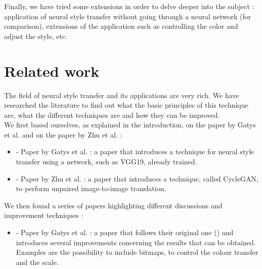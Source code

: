 \documentclass[twocolumn,superscriptaddress,aps]{revtex4-1}
\begin{document}
    Finally, we have tried some extensions in order to delve deeper into the subject : application of neural style transfer without going through a neural network (for comparison), extensions of the application such as controlling the color and adjust the style, etc.
    
    
    
    
    \section{Related work}
    
    The field of neural style transfer and its applications are very rich. We have researched the literature to find out what the basic principles of this technique are, what the different techniques are and how they can be improved.\\
    
    We first based ourselves, as explained in the introduction, on the paper by Gatys et al. and on the paper by Zhu et al. :
    
    \begin{itemize}
        \item \cite{DBLP:journals/corr/GatysEB15a} - Paper by Gatys et al. : a paper that introduces a technique for neural style transfer using a network, such as VGG19, already trained.
        \item \cite{DBLP:journals/corr/ZhuPIE17} - Paper by Zhu et al. : a paper that introduces a technique, called CycleGAN, to perform unpaired image-to-image translation.
    \end{itemize}
    
    We then found a series of papers highlighting different discussions and improvement techniques :
    
    \begin{itemize}
        \item \cite{DBLP:journals/corr/GatysEBHS16} - Paper by Gatys et al. : a paper that follows their original one (\cite{DBLP:journals/corr/GatysEB15a}) and introduces several improvements concerning the results that can be obtained. Examples are the possibility to include bitmaps, to control the colour transfer and the scale.
    \end{itemize}
    
\end{document}
